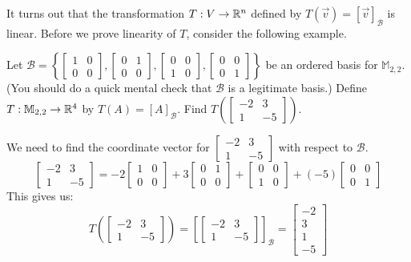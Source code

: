\documentclass{ximera}
\begin{document}
It turns out that the transformation $T:V\rightarrow \mathbb{R}^n$ defined by $T(\vec{v})=[\vec{v}]_{\mathcal{B}}$ is linear.  Before we prove linearity of $T$, consider the following example.

\begin{example}\label{ex:abstvectsplintranscoordvect1}
Let $\mathcal{B}=\left\{\begin{bmatrix}1&0\\0&0\end{bmatrix}, \begin{bmatrix}0&1\\0&0\end{bmatrix}, \begin{bmatrix}0&0\\1&0\end{bmatrix}, \begin{bmatrix}0&0\\0&1\end{bmatrix}\right\}$ be an ordered basis for $\mathbb{M}_{2,2}$.  (You should do a quick mental check that $\mathcal{B}$ is a legitimate basis.)  Define $T:\mathbb{M}_{2,2}\rightarrow \mathbb{R}^4$ by $T(A)=[A]_{\mathcal{B}}$.  Find $T\left(\begin{bmatrix}-2&3\\1&-5\end{bmatrix}\right)$.
\begin{explanation}
We need to find the coordinate vector for $\begin{bmatrix}-2&3\\1&-5\end{bmatrix}$ with respect to $\mathcal{B}$.
$$\begin{bmatrix}-2&3\\1&-5\end{bmatrix}=-2\begin{bmatrix}1&0\\0&0\end{bmatrix}+ 3\begin{bmatrix}0&1\\0&0\end{bmatrix}+ \begin{bmatrix}0&0\\1&0\end{bmatrix}+ (-5)\begin{bmatrix}0&0\\0&1\end{bmatrix}$$
This gives us:
$$T\left(\begin{bmatrix}-2&3\\1&-5\end{bmatrix}\right)=\left[\begin{bmatrix}-2&3\\1&-5\end{bmatrix}\right]_{\mathcal{B}}=\begin{bmatrix}-2\\3\\1\\-5\end{bmatrix}$$
\end{explanation}
\end{example}
\end{document}

